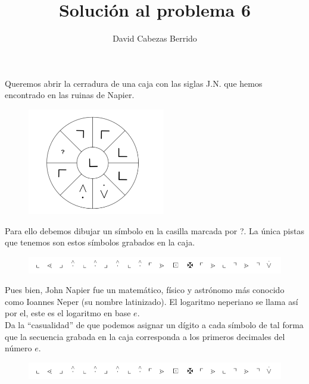 \documentclass[12pt,spanish]{article}
\begin{document}
\title{Solución al problema 6}
\author{David Cabezas Berrido}
\date{\vspace{-5mm}}
\maketitle

Queremos abrir la cerradura de una caja con las siglas J.N. que hemos
encontrado en las ruinas de Napier. 

\begin{figure}[H]
  \centering
  \includegraphics[width=60mm]{6_imagenes/cerradura}
\end{figure}

Para ello debemos dibujar un símbolo en la casilla marcada por ?. La
única pistas que tenemos son estos símbolos grabados en la caja.

\begin{figure}[H]
  \centering
  \includegraphics[width=120mm]{6_imagenes/simbolos}
\end{figure}

Pues bien, John Napier fue un matemático, físico y astrónomo más
conocido como Ioannes Neper (su nombre latinizado). El logaritmo
neperiano se llama así por el, este es el logaritmo en base $e$. \\

Da la ``casualidad'' de que podemos asignar un dígito a cada símbolo de
tal forma que la secuencia grabada en la caja corresponda a los
primeros decimales del número $e$.

\begin{figure}[H]
  \centering
  \hspace{0.4mm}
  \includegraphics[width=136mm]{6_imagenes/simbolos}
\end{figure}
\end{document}
